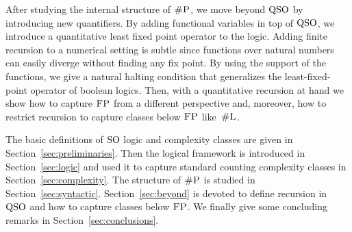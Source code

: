 After studying the internal structure of $\text{\sc \#P}$, we move beyond ${\rm QSO}$ by introducing new quantifiers. 
By adding functional variables in top of ${\rm QSO}$, we introduce a quantitative least fixed point operator to the logic. 
Adding finite recursion to a numerical setting is subtle since functions over natural numbers can easily diverge without finding any fix point. 
By using the support of the functions, we give a natural halting condition that generalizes the least-fixed-point operator of boolean logics. 
Then, with a quantitative recursion at hand we show how to capture $\text{\sc FP}$ from a different perspective and, moreover, how to restrict recursion to capture classes below $\text{\sc FP}$ like~$\text{\sc \#L}$. 

 The basic definitions of ${\rm SO}$ logic and complexity classes are given in Section~\ref{sec:preliminaries}. Then the logical framework is introduced in Section~\ref{sec:logic} and used it to capture standard counting complexity classes in Section~\ref{sec:complexity}. The structure of $\text{\sc \#P}$ is studied in Section~\ref{sec:syntactic}. Section~\ref{sec:beyond} is devoted to define recursion in ${\rm QSO}$ and how to capture classes below $\text{\sc FP}$. 
We finally give some concluding remarks in Section~\ref{sec:conclusions}. 
